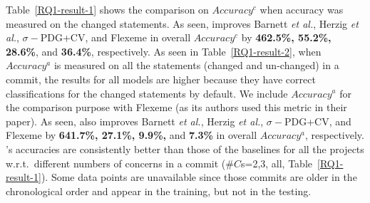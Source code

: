 

Table~\ref{RQ1-result-1} shows the comparison on $Accuracy^{c}$ when
accuracy was measured on the changed statements. As seen, {\tool}
improves Barnett {\em et al.}, Herzig {\em et al.}, $\sigma-$PDG+CV,
and Flexeme in overall $Accuracy^c$ by {\bf 462.5\%, 55.2\%, 28.6\%},
and {\bf 36.4\%}, respectively. As seen in Table~\ref{RQ1-result-2},
when $Accuracy^{a}$ is measured on all the statements (changed and
un-changed) in a commit, the results for all models are higher because
they have correct classifications for the changed statements by
default. We include $Accuracy^{a}$ for the comparison purpose with
Flexeme (as its authors used this metric in their paper). As seen,
{\tool} also improves Barnett {\em et al.}, Herzig {\em et al.},
$\sigma-$PDG+CV, and Flexeme by {\bf 641.7\%, 27.1\%, 9.9\%,} and {\bf
  7.3\%} in overall $Accuracy^{a}$, respectively. {\tool}'s accuracies
are consistently better than those of the baselines for all the
projects w.r.t.~different numbers of concerns in a commit
($\#C$s=2,3, all, Table~\ref{RQ1-result-1}). Some data points
are unavailable since those commits are older in the chronological
order and appear in the training, but not in the testing.






